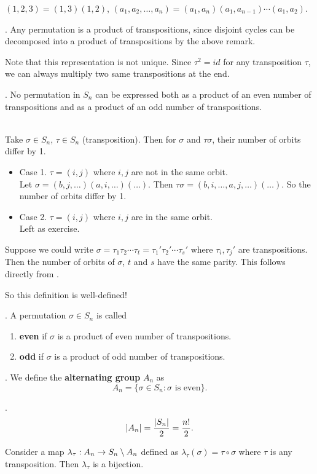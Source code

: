 \rmk \((1, 2, 3) = (1, 3) (1, 2)\), \((a_1, a_2, \dots, a_n) = (a_1, a_n) (a_1, a_{n - 1}) \cdots (a_1, a_2)\).

\cor. Any permutation is a product of transpositions, since disjoint cycles can be decomposed into a product of transpositions by the above remark.

Note that this representation is not unique. Since \(\tau^2 = id\) for any transposition \(\tau\), we can always multiply two same transpositions at the end.

\thm. No permutation in \(S_n\) can be expressed both as a product of an even number of transpositions and as a product of an odd number of transpositions.

\pf \\
 Take \(\sigma \in S_n\), \(\tau \in S_n\) (transposition). Then for \(\sigma\) and \(\tau\sigma\), their number of orbits differ by 1.
\begin{itemize}
    \item Case 1. \(\tau = (i, j)\) where \(i, j\) are not in the same orbit. \\
    Let \(\sigma = (b, j, \dots) (a, i, \dots) (\dots)\). Then \(\tau\sigma = (b, i, \dots, a, j, \dots)(\dots)\). So the number of orbits differ by 1.
    \item Case 2. \(\tau = (i, j)\) where \(i, j\) are in the same orbit. \\
    Left as exercise.
\end{itemize}

 Suppose we could write \(\sigma = \tau_1\tau_2\cdots\tau_t = \tau_1'\tau_2'\cdots\tau_s'\) where \(\tau_i, \tau_j'\) are transpositions. Then the number of orbits of \(\sigma\), \(t\) and \(s\) have the same parity. This follows directly from .

So this definition is well-defined!

. A permutation \(\sigma \in S_n\) is called
\begin{enumerate}
    \item \textbf{even} if \(\sigma\) is a product of even number of transpositions.
    \item \textbf{odd} if \(\sigma\) is a product of odd number of transpositions.
\end{enumerate}

.  We define the \textbf{alternating group} \(A_n\) as
\[
    A_n = \{\sigma \in S_n : \sigma \text{ is even}\}.
\]

\thm.
\[
    \left| A_n \right| = \frac{\left| S_n \right|}{2} = \frac{n!}{2}.
\]

\pf Consider a map \(\lambda_\tau: A_n \rightarrow S_n \setminus A_n\) defined as \(\lambda_\tau(\sigma) = \tau\circ\sigma\) where \(\tau\) is any transposition. Then \(\lambda_\tau\) is a bijection.

\pagebreak
